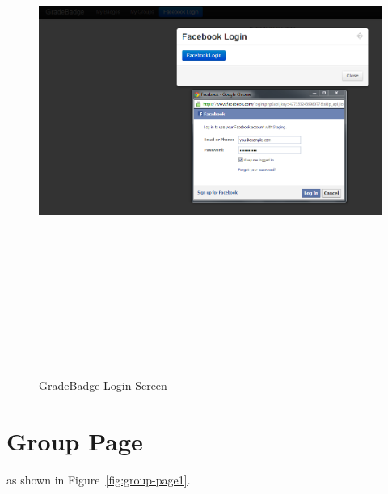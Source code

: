 \vspace{3em}
\begin{figure}[H]
\begin{center}
\includegraphics[height=6.8in,width=6.5in]{images/facebook-login.jpg}
\caption{GradeBadge Login Screen}
\label{fig:login_screen}
\end{center}
\end{figure}

\newpage
\section{Group Page}
 as shown in Figure~\ref{fig:group-page1}. 

